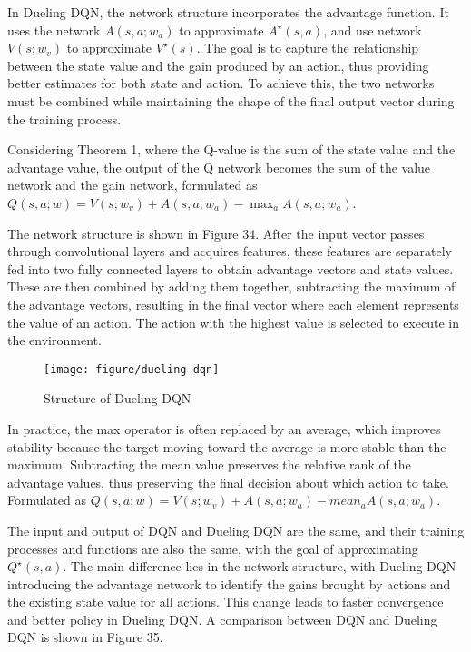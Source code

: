 \documentclass{article}
\begin{document}
In Dueling DQN, the network structure incorporates the advantage function. It uses the network $A(s,a;w_a)$ to approximate $A^{\star}(s,a)$, and use network $V(s;w_v)$ to approximate $V^{\star}(s)$. The goal is to capture the relationship between the state value and the gain produced by an action, thus providing better estimates for both state and action. To achieve this, the two networks must be combined while maintaining the shape of the final output vector during the training process.

Considering Theorem 1, where the Q-value is the sum of the state value and the advantage value, the output of the Q network becomes the sum of the value network and the gain network, formulated as $Q(s,a;w) = V(s;w_v) + A(s,a;w_a) - \max_a A(s,a;w_a)$.

The network structure is shown in Figure 34. After the input vector passes through convolutional layers and acquires features, these features are separately fed into two fully connected layers to obtain advantage vectors and state values. These are then combined by adding them together, subtracting the maximum of the advantage vectors, resulting in the final vector where each element represents the value of an action. The action with the highest value is selected to execute in the environment.

\begin{figure}[htbp]
        \centering
        \texttt{[image: figure/dueling-dqn]}
        \caption{Structure of Dueling DQN}
\end{figure}


In practice, the max operator is often replaced by an average, which improves stability because the target moving toward the average is more stable than the maximum. Subtracting the mean value preserves the relative rank of the advantage values, thus preserving the final decision about which action to take. Formulated as $Q(s,a;w) = V(s;w_v) + A(s,a;w_a) - mean_a A(s,a;w_a)$.

The input and output of DQN and Dueling DQN are the same, and their training processes and functions are also the same, with the goal of approximating $Q^{\star}(s,a)$. The main difference lies in the network structure, with Dueling DQN introducing the advantage network to identify the gains brought by actions and the existing state value for all actions. This change leads to faster convergence and better policy in Dueling DQN. A comparison between DQN and Dueling DQN is shown in Figure 35.
\end{document}

